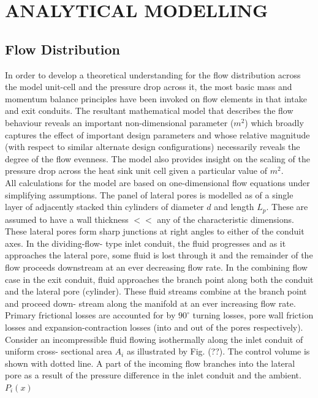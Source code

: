 \documentclass[twocolumn,10pt,cleanfoot]{ihmtc}
\begin{document}
\section{ANALYTICAL MODELLING}
\subsection{Flow Distribution}\label{BMmodel}
In order to develop a theoretical understanding for the flow distribution
across the model unit-cell and the pressure drop across it, the most
basic mass and momentum balance principles have been invoked on flow
elements in that intake and exit conduits. The resultant mathematical
model that describes the flow behaviour reveals an important non-dimensional
parameter ($m^2$) which broadly captures the effect of important
design parameters and whose relative magnitude (with respect to similar
alternate design configurations) necessarily reveals the degree of
the flow evenness. The model also provides insight on the scaling
of the pressure drop across the heat sink unit cell given a particular
value of $m^2$. \\
%
%
All calculations for the model are based on one-dimensional flow equations
under simplifying assumptions. The panel of lateral pores is modelled
as of a single layer of adjacently stacked thin cylinders of diameter
$d$ and length $L_p$. These are assumed to have a wall thickness
$<<$ any of the characteristic dimensions. These lateral
pores form sharp junctions at right angles to either of the conduit
axes. In the dividing-flow- type inlet conduit, the fluid progresses
and as it approaches the lateral pore, some fluid is lost through
it and the remainder of the flow proceeds downstream at an ever decreasing
flow rate. In the combining flow case in the exit conduit, fluid approaches
the branch point along both the conduit and the lateral pore (cylinder).
These fluid streams combine at the branch point and proceed down-
stream along the manifold at an ever increasing flow rate. Primary
frictional losses are accounted for by $90^{\circ}$ turning losses,
pore wall friction losses and expansion-contraction losses (into and
out of the pores respectively). \\
%
%
Consider an incompressible fluid flowing isothermally along the inlet
conduit of uniform cross- sectional area $A_i$ as illustrated by
Fig. (??). The control volume is shown with dotted line. A part of
the incoming flow branches into the lateral pore as a result of the
pressure difference in the inlet conduit and the ambient. $P_i(x)$
\end{document}
